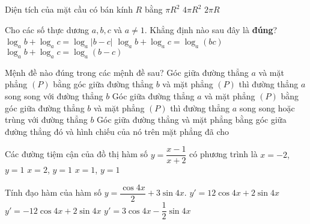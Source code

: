 \begin{ex}%
Diện tích của mặt cầu có bán kính $R$ bằng
{$\pi R^2$}
{\True $4\pi R^2$}
{$2\pi R$}
\end{ex}

\begin{ex}%
Cho các số thực dương $a,b,c$ và $a\neq 1$. Khẳng định nào sau đây là \textbf{đúng}?
{$\log_ab+\log_ac=\log_a|b-c|$}
{\True $\log_ab+\log_ac=\log_a(bc)$}
{$\log_ab+\log_ac=\log_a(b-c)$}
\end{ex}

\begin{ex}%
Mệnh đề nào đúng trong các mệnh đề sau?
{Góc giữa đường thẳng $a$ và mặt phẳng $(P)$ bằng góc giữa đường thẳng $b$ và mặt phẳng $(P)$ thì đường thẳng $a$ song song với đường thẳng $b$}
{Góc giữa đường thẳng $a$ và mặt phẳng $(P)$ bằng góc giữa đường thẳng $b$ và mặt phẳng $(P)$ thì đường thẳng $a$ song song hoặc trùng với đường thẳng $b$}
{\True Góc giữa đường thẳng và mặt phẳng bằng góc giữa đường thẳng đó và hình chiếu của nó trên mặt phẳng đã cho}
\end{ex}

\begin{ex}%
Các đường tiệm cận của đồ thị hàm số $y=\dfrac{x-1}{x+2}$ có phương trình là
{\True $x=-2$, $y=1$}
{$x=2$, $y=1$}
{$x=1$, $y=1$}
\end{ex}

\begin{ex}%
Tính  đạo hàm của hàm số $y=\dfrac{\cos 4x}{2}+3\sin 4x$.
{$y'=12\cos 4x+2\sin 4x$}
{$y'=-12\cos 4x+2\sin 4x$}
{$y'=3\cos 4x-\dfrac{1}{2}\sin 4x$}
\end{ex}

